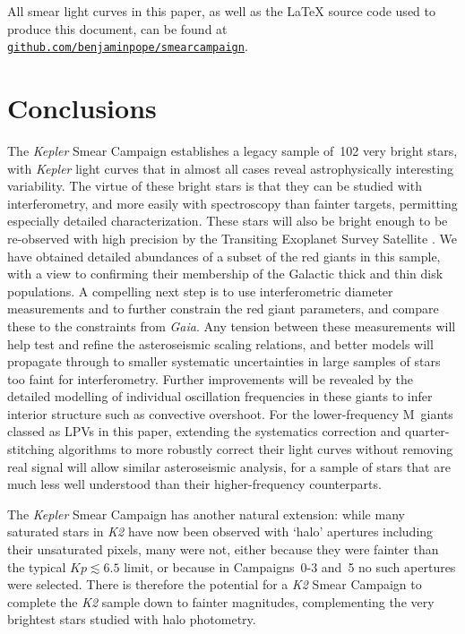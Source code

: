 \documentclass[modern]{aastex62}
\newcommand{\kepler}{\textit{Kepler}\xspace}
\newcommand{\ktwo}{\textit{K2}\xspace}
\newcommand{\gaia}{\textit{Gaia}\xspace}
\begin{document}
All smear light curves in this paper, as well as the \LaTeX{} source code used to produce this document, can be found
at \href{https://github.com/benjaminpope/smearcampaign}{\nolinkurl{github.com/benjaminpope/smearcampaign}}.


\section{Conclusions}
\label{conclusions}

The \kepler Smear Campaign establishes a legacy sample of~102 very bright stars, with \kepler light curves that in almost all cases reveal astrophysically interesting variability. The virtue of these bright stars is that they can be studied with interferometry, and more easily with spectroscopy than fainter targets, permitting especially detailed characterization. These stars will also be bright enough to be re-observed with high precision by the Transiting Exoplanet Survey Satellite \citep[TESS;][]{tess}. We have obtained detailed abundances of a subset of the red giants in this sample, with a view to confirming their membership of the Galactic thick and thin disk populations. A compelling next step is to use interferometric diameter measurements and to further constrain the red giant parameters, and compare these to the constraints from \gaia. Any tension between these measurements will help test and refine the asteroseismic scaling relations, and better models will propagate through to smaller systematic uncertainties in large samples of stars too faint for interferometry. Further improvements will be revealed by the detailed modelling of individual oscillation frequencies in these giants to infer interior structure such as convective overshoot. For the lower-frequency M~giants classed as LPVs in this paper, extending the systematics correction and quarter-stitching algorithms to more robustly correct their light curves without removing real signal will allow similar asteroseismic analysis, for a sample of stars that are much less well understood than their higher-frequency counterparts. 

The \kepler Smear Campaign has another natural extension: while many saturated stars in \ktwo have now been observed with `halo' apertures including their unsaturated pixels, many were not, either because they were fainter than the typical $Kp \lesssim 6.5$ limit, or because in Campaigns~0-3 and~5 no such apertures were selected. There is therefore the potential for a \ktwo Smear Campaign to complete the \ktwo sample down to fainter magnitudes, complementing the very brightest stars studied with halo photometry. 
\end{document}
